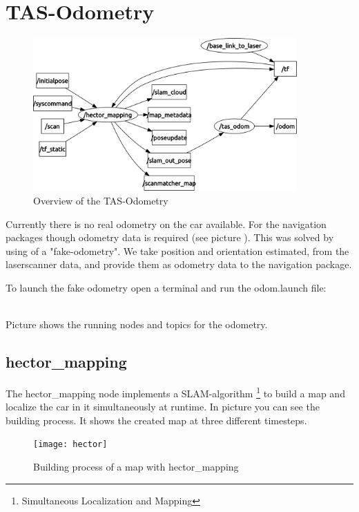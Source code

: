 \newpage
\section{TAS-Odometry}
\label{sec:tas_package_odom}

\begin{figure}[h]
	\centering
		\includegraphics[width=0.9\textwidth]{diagrams/rqt_odom}
	\caption{Overview of the TAS-Odometry}
	\label{fig:rqt_odom}
\end{figure}

Currently there is no real odometry on the car available. For the navigation packages though odometry data is required (see picture ). This was solved by using of a "fake-odometry". We take position and orientation estimated, from the laserscanner data, and provide them as odometry data to the navigation package. 

To launch the fake odometry open a terminal and run the odom.launch file:

 \\

Picture  shows the running nodes and topics for the odometry.

\subsection{hector\_mapping}
\label{sec:tas_package_odom_hector}

The hector\_mapping node implements a SLAM-algorithm \footnote{Simultaneous Localization and Mapping} to build a map and localize the car in it simultaneously at runtime. In picture  you can see the building process. It shows the created map at three different timesteps.

\begin{figure}[h]
	\centering
		\texttt{[image: hector]}
	\caption{Building process of a map with hector\_mapping}
	\label{fig:hector_buidling_process}
\end{figure}

